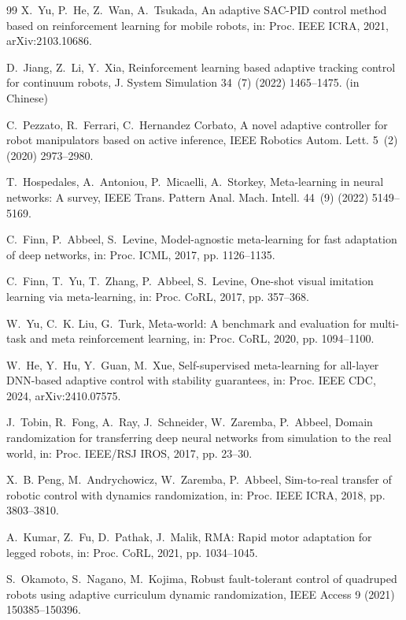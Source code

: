 \documentclass[DTMColor]{ROB-New}
\begin{document}
\begin{thebibliography}{99}
X.~Yu, P.~He, Z.~Wan, A.~Tsukada, An adaptive SAC-PID control method based on reinforcement learning for mobile robots, in: Proc. IEEE ICRA, 2021, arXiv:2103.10686.

D.~Jiang, Z.~Li, Y.~Xia, Reinforcement learning based adaptive tracking control for continuum robots, J. System Simulation 34~(7) (2022) 1465--1475. (in Chinese)

C.~Pezzato, R.~Ferrari, C.~Hernandez Corbato, A novel adaptive controller for robot manipulators based on active inference, IEEE Robotics Autom. Lett. 5~(2) (2020) 2973--2980.

T.~Hospedales, A.~Antoniou, P.~Micaelli, A.~Storkey, Meta-learning in neural networks: A survey, IEEE Trans. Pattern Anal. Mach. Intell. 44~(9) (2022) 5149--5169.

C.~Finn, P.~Abbeel, S.~Levine, Model-agnostic meta-learning for fast adaptation of deep networks, in: Proc. ICML, 2017, pp. 1126--1135.

C.~Finn, T.~Yu, T.~Zhang, P.~Abbeel, S.~Levine, One-shot visual imitation learning via meta-learning, in: Proc. CoRL, 2017, pp. 357--368.

W.~Yu, C.~K. Liu, G.~Turk, Meta-world: A benchmark and evaluation for multi-task and meta reinforcement learning, in: Proc. CoRL, 2020, pp. 1094--1100.

W.~He, Y.~Hu, Y.~Guan, M.~Xue, Self-supervised meta-learning for all-layer DNN-based adaptive control with stability guarantees, in: Proc. IEEE CDC, 2024, arXiv:2410.07575.

J.~Tobin, R.~Fong, A.~Ray, J.~Schneider, W.~Zaremba, P.~Abbeel, Domain randomization for transferring deep neural networks from simulation to the real world, in: Proc. IEEE/RSJ IROS, 2017, pp. 23--30.

X.~B. Peng, M.~Andrychowicz, W.~Zaremba, P.~Abbeel, Sim-to-real transfer of robotic control with dynamics randomization, in: Proc. IEEE ICRA, 2018, pp. 3803--3810.

A.~Kumar, Z.~Fu, D.~Pathak, J.~Malik, RMA: Rapid motor adaptation for legged robots, in: Proc. CoRL, 2021, pp. 1034--1045.

S.~Okamoto, S.~Nagano, M.~Kojima, Robust fault-tolerant control of quadruped robots using adaptive curriculum dynamic randomization, IEEE Access 9 (2021) 150385--150396.


\end{thebibliography}
\end{document}
